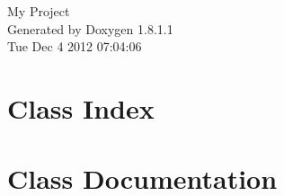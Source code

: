 \documentclass{book}
\begin{document}
\hypersetup{pageanchor=false,citecolor=blue}
\begin{titlepage}
\vspace*{7cm}
\begin{center}
{\Large My Project }\\
\vspace*{1cm}
{\large Generated by Doxygen 1.8.1.1}\\
\vspace*{0.5cm}
{\small Tue Dec 4 2012 07:04:06}\\
\end{center}
\end{titlepage}
\clearemptydoublepage
{}
\tableofcontents
\clearemptydoublepage
{}
\hypersetup{pageanchor=true,citecolor=blue}
\chapter{Class Index}

\chapter{Class Documentation}






















\printindex
\end{document}
